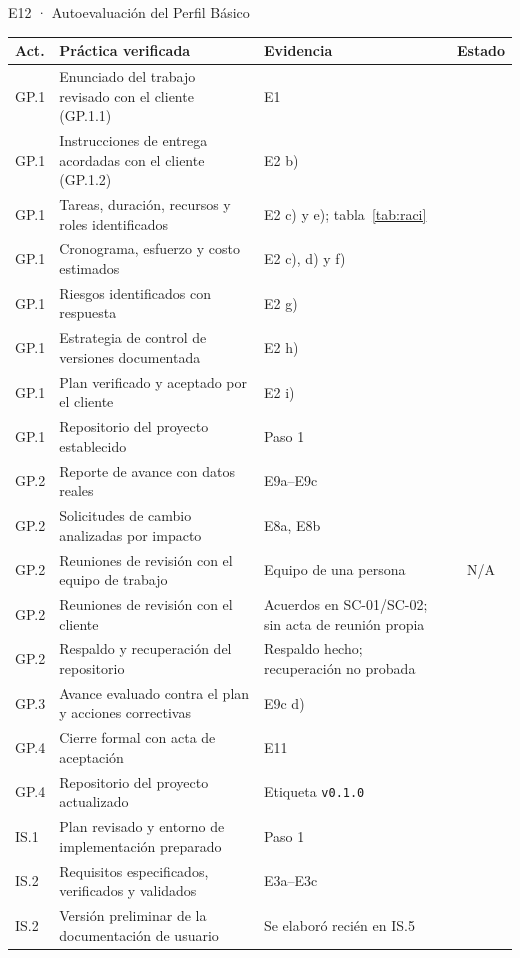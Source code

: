\documentclass[11pt,a4paper]{article}
\newcommand{\si}{\textcolor{verdeespe}{\ding{51}}}
\newcommand{\parcial}{\textcolor{ambar}{\ding{108}}}
\newcommand{\cod}[1]{\texttt{\small #1}}
\begin{document}
\begin{evidencia}{E12 · Autoevaluación del Perfil Básico}
\small
\begin{longtable}{@{}l >{\raggedright\arraybackslash}p{6.9cm} >{\raggedright\arraybackslash}p{3.6cm} c@{}}
\toprule
\textbf{Act.} & \textbf{Práctica verificada} & \textbf{Evidencia} & \textbf{Estado} \\
\midrule
\endhead
GP.1 & Enunciado del trabajo revisado con el cliente (GP.1.1) & E1 & \si \\
GP.1 & Instrucciones de entrega acordadas con el cliente (GP.1.2) & E2 b) & \si \\
GP.1 & Tareas, duración, recursos y roles identificados & E2 c) y e); tabla~\ref{tab:raci} & \si \\
GP.1 & Cronograma, esfuerzo y costo estimados & E2 c), d) y f) & \si \\
GP.1 & Riesgos identificados con respuesta & E2 g) & \si \\
GP.1 & Estrategia de control de versiones documentada & E2 h) & \si \\
GP.1 & Plan verificado y aceptado por el cliente & E2 i) & \si \\
GP.1 & Repositorio del proyecto establecido & Paso 1 & \si \\
GP.2 & Reporte de avance con datos reales & E9a–E9c & \si \\
GP.2 & Solicitudes de cambio analizadas por impacto & E8a, E8b & \si \\
GP.2 & Reuniones de revisión con el equipo de trabajo & Equipo de una persona & N/A \\
GP.2 & Reuniones de revisión con el cliente & Acuerdos en SC-01/SC-02; sin acta de reunión propia & \parcial \\
GP.2 & Respaldo y recuperación del repositorio & Respaldo hecho; recuperación no probada & \parcial \\
GP.3 & Avance evaluado contra el plan y acciones correctivas & E9c d) & \si \\
GP.4 & Cierre formal con acta de aceptación & E11 & \si \\
GP.4 & Repositorio del proyecto actualizado & Etiqueta \cod{v0.1.0} & \si \\
IS.1 & Plan revisado y entorno de implementación preparado & Paso 1 & \si \\
IS.2 & Requisitos especificados, verificados y validados & E3a–E3c & \si \\
IS.2 & Versión preliminar de la documentación de usuario & Se elaboró recién en IS.5 & \parcial \\

\end{longtable}
\end{evidencia}
\end{document}
